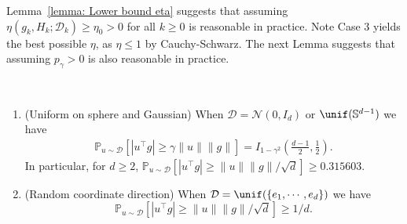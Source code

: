 Lemma~\ref{lemma: Lower bound eta} suggests that assuming $\eta(g_k, H_k; \mathcal{D}_k) \geq \eta_{0} > 0$ for all $k\geq 0$ is reasonable in practice. Note Case 3 yields the best possible $\eta$, as $\eta\leq1$ by Cauchy-Schwarz. The next Lemma suggests that assuming $p_{\gamma} > 0$ is also reasonable in practice.


\begin{lemma}\label{lemma: p_gamma lower bounds} ~
    \begin{enumerate}
        \item (Uniform on sphere and Gaussian) When $\mathcal{D} = \mathcal{N}(0, I_d)$ or $\unif(\mathbb{S}^{d-1})$ we have
              \begin{align}\label{eq: p_gamma bound for normal and uniform sphere}
                  \mathbb{P}_{u\sim\mathcal{D}} \left[ |u^{\top}g| \geq \gamma \|u\|\|g\|\right] = I_{1-\gamma^2}\left(\frac{d-1}{2}, \frac{1}{2} \right).
              \end{align}
              In particular, for $d\geq 2$, $\mathbb{P}_{u\sim\mathcal{D}} \left[ |u^{\top}g| \geq \|u\|\|g\|/\sqrt{d} \right] \geq 0.315603$.
        \item (Random coordinate direction) When $\mathcal{D} = \unif(\{e_1, \cdots, e_d\})$ we have
              $$\mathbb{P}_{u\sim\mathcal{D}} \left[ |u^{\top}g| \geq \|u\|\|g\|/\sqrt{d}\right] \geq 1/d.$$

    \end{enumerate}
\end{lemma}

